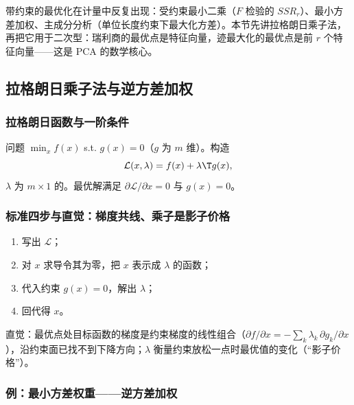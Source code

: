 带约束的最优化在计量中反复出现：受约束最小二乘（$F$ 检验的 $SSR_r$）、最小方差加权、主成分分析（单位长度约束下最大化方差）。本节先讲拉格朗日乘子法，再把它用于二次型：瑞利商的最优点是特征向量，迹最大化的最优点是前 $r$ 个特征向量——这是 PCA 的数学核心。

\subsection{拉格朗日乘子法与逆方差加权}

\subsubsection{拉格朗日函数与一阶条件}

\begin{defn}[拉格朗日乘子法]\label{def:U01a-lagrange}
问题 $\min_xf(x)$ s.t. $g(x)=0$（$g$ 为 $m$ 维）。构造
\[
\mathcal L(x,\lambda)=f(x)+\lambda\T g(x),
\]
$\lambda$ 为 $m\times1$ 的。最优解满足 $\partial\mathcal L/\partial x=0$ 与 $g(x)=0$。
\end{defn}

\subsubsection{标准四步与直觉：梯度共线、乘子是影子价格}

\begin{method}[拉格朗日乘子法的标准四步]
\begin{enumerate}
  \item 写出 $\mathcal L$；
  \item 对 $x$ 求导令其为零，把 $x$ 表示成 $\lambda$ 的函数；
  \item 代入约束 $g(x)=0$，解出 $\lambda$；
  \item 回代得 $x$。
\end{enumerate}
\end{method}
直觉：最优点处目标函数的梯度是约束梯度的线性组合（$\partial f/\partial x=-\sum_k\lambda_k\,\partial g_k/\partial x$），沿约束面已找不到下降方向；$\lambda$ 衡量约束放松一点时最优值的变化（“影子价格”）。

\subsubsection{例：最小方差权重——逆方差加权}

